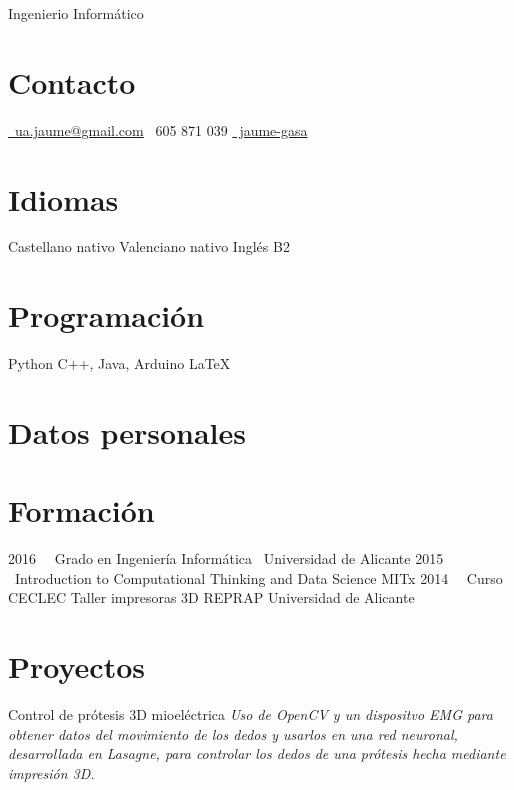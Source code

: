 \documentclass[]{friggeri-cv}
\begin{document}
       {Ingenierio Informático}


\begin{aside}
  \section{Contacto}
    \noindent \href{mailto:ua.jaume@gmail.com}{\faEnvelope~ua.jaume@gmail.com} \hfill
    \faMobile~605 871 039
    \href{https://github.com/jaume-gasa/}{\faGithub ~jaume-gasa}
  \section{Idiomas}
    Castellano nativo
    Valenciano nativo
    Inglés B2
  \section{Programación}
    {\color{red} \faHeart} Python
    C++, Java, Arduino
    \LaTeX{}
\end{aside}


\section{Datos personales}


\section{Formación}

\begin{entrylist}
  \threeentry
    {2016~}
    {~Grado en Ingeniería Informática}
    {~Universidad de Alicante}
  \threeentry
    {2015~}
    {~Introduction to Computational Thinking and Data Science}
    {MITx}
  \threeentry
    {2014~}
    {~Curso CECLEC Taller impresoras 3D REPRAP}
    {Universidad de Alicante}
\end{entrylist}

\section{Proyectos}

\begin{entrylist}
  \entry
    {}
    {Control de prótesis 3D mioeléctrica}
    {}
    {\emph{Uso de OpenCV y un dispositvo EMG para obtener datos del movimiento de los dedos
    y usarlos en una red neuronal, desarrollada en Lasagne, para controlar los dedos de una
    prótesis hecha mediante impresión 3D.}}
\end{entrylist}
\end{document}
